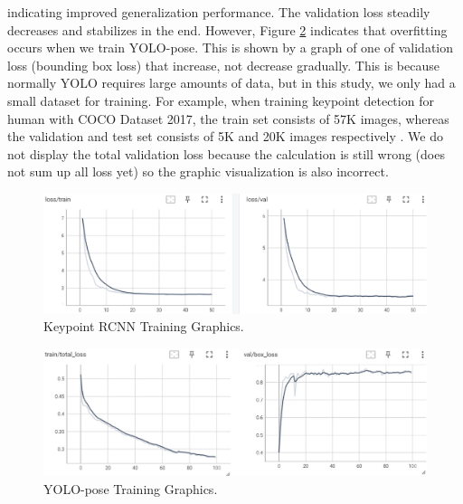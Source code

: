   indicating improved generalization performance. The validation loss steadily decreases and stabilizes in the end.
However, Figure \ref{fig:yolo-training-graphics} indicates that overfitting occurs when we train YOLO-pose. This is shown by a graph of one of validation loss (bounding box loss) that increase, not decrease gradually.
This is because normally YOLO requires large amounts of data, but in this study, we only had a small dataset for training. For example, when training keypoint detection for human with COCO Dataset 2017,
  the train set consists of 57K images, whereas the validation and test set consists of 5K and 20K images respectively \parencite{maji2022yolopose}.
We do not display the total validation loss because the calculation is still wrong (does not sum up all loss yet) so the graphic visualization is also incorrect.
\begin{figure}[ht]
  \centering
  \includegraphics[scale=0.65]{gambar/loss-rcnn.png}
  \caption{Keypoint RCNN Training Graphics.}
  \label{fig:rcnn-training-graphics}
\end{figure}
\begin{figure}[ht]
  \centering
  \includegraphics[scale=0.5]{gambar/loss-yolo.jpg}
  \caption{YOLO-pose Training Graphics.}
  \label{fig:yolo-training-graphics}
\end{figure}

